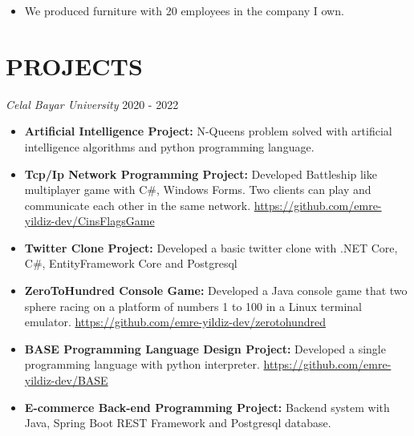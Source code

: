 \documentclass[line,margin]{res}
\begin{document}
\begin{resume}
\begin{itemize}
\begin{itemize}
                   \item We produced furniture with 20 employees in the company I own.
                   \end{itemize} 

\section{PROJECTS}{\sl Celal Bayar University} \hfill        2020 - 2022 \\
                  \begin{itemize}
                   \item \textbf{Artificial Intelligence Project: } N-Queens problem solved with artificial intelligence algorithms and python programming language. 
                   \item \textbf{Tcp/Ip Network Programming Project: } Developed Battleship like multiplayer game with C\#, Windows Forms. Two clients can play and communicate each other in the same network. \href{https://github.com/emre-yildiz-dev/CinsFlagsGame}{https://github.com/emre-yildiz-dev/CinsFlagsGame}
                   \item \textbf{Twitter Clone Project: } Developed a basic twitter clone with .NET Core, C\#, EntityFramework Core and Postgresql
                    \item \textbf{ZeroToHundred Console Game: } Developed a Java console game that two sphere racing on a platform of numbers 1 to 100 in a Linux terminal emulator. \href{https://github.com/emre-yildiz-dev/zerotohundred}{https://github.com/emre-yildiz-dev/zerotohundred} 
                     \item \textbf{BASE Programming Language Design Project: } Developed a single programming language with python interpreter. \href{https://github.com/emre-yildiz-dev/BASE}{https://github.com/emre-yildiz-dev/BASE}
                     \item \textbf{E-commerce Back-end Programming Project: } Backend system with Java, Spring Boot REST Framework and Postgresql database.
                      

\end{itemize}
\end{itemize}
\end{resume}
\end{document}
